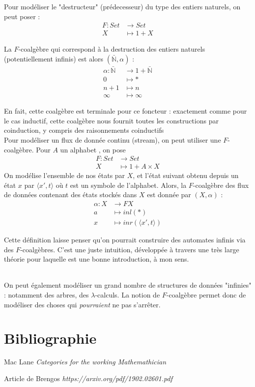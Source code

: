 \documentclass{article}
\newcommand{\N}{\mathbb{N}}
\begin{document}
Pour modéliser le "destructeur" (prédecesseur) du type des entiers naturels, on peut poser : 
\begin{align*}
    F : Set & \rightarrow Set \\ 
        X & \mapsto 1 + X
\end{align*}

La $F$-coalgèbre qui correspond à la destruction des entiers naturels (potentiellement infinis) est alors $(\bar{\N}, \alpha)$ : 
\begin{align*}
    \alpha : \bar{\N} &\rightarrow 1 + \bar{\N} \\ 
            0 &\mapsto * \\ 
            n+1 & \mapsto n \\
            \infty & \mapsto \infty
\end{align*}

En fait, cette coalgèbre est terminale pour ce foncteur : exactement comme pour le cas inductif, cette coalgèbre nous fournit toutes les constructions par coinduction, y compris des raisonnements coinductifs
\\

Pour modéliser un flux de donnée continu (stream), on peut utiliser une $F$-coalgèbre. Pour $A$ un alphabet ,  on pose
\begin{align*}
    F : Set & \rightarrow Set \\ 
        X & \mapsto 1 + A \times X
\end{align*}
On modélise l'ensemble de nos états par $X$, et l'état suivant obtenu depuis un état $x$ par $\langle x', t \rangle $ où $t$ est un symbole de l'alphabet.
Alors, la $F$-coalgèbre des flux de données contenant des états stockés dans $X$  est donnée par $(X,\alpha)$  : 
\begin{align*}
    \alpha : X & \rightarrow FX \\ 
             a & \mapsto inl(*) \\
             x & \mapsto inr(\langle x', t \rangle)
\end{align*}

Cette définition laisse penser qu'on pourrait construire des automates infinis via des $F$-coalgèbres. C'est une juste intuition, développée à travers une très large théorie pour laquelle \cite{Cet article} est une bonne introduction, à mon sens. 

\\ 

On peut également modéliser un grand nombre de structures de données "infinies" : notamment des arbres, des $\lambda$-calculs. La notion de $F$-coalgèbre permet donc de modéliser des choses qui \textit{pourraient} ne pas s'arrêter. 
    
\section{Bibliographie}

\begin{thebibliography}{9}

Mac Lane \emph{Categories for the working Mathemathician}

Article de Brengos \emph{https://arxiv.org/pdf/1902.02601.pdf}


\end{thebibliography}
\end{document}
